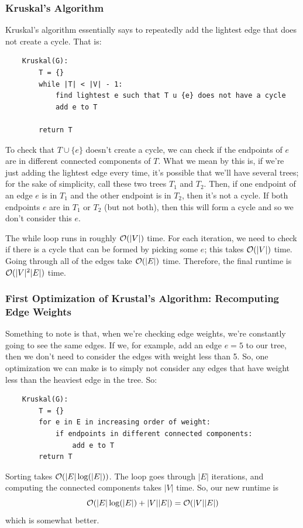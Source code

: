 \documentclass[letterpaper]{article}
\begin{document}
\subsubsection{Kruskal's Algorithm}
Kruskal's algorithm essentially says to repeatedly add the lightest edge that does not create a cycle. That is: 

\begin{verbatim}
    Kruskal(G):
        T = {}
        while |T| < |V| - 1:
            find lightest e such that T u {e} does not have a cycle 
            add e to T 

        return T 
\end{verbatim}
To check that $T \cup \{e\}$ doesn't create a cycle, we can check if the endpoints of $e$ are in different connected components of $T$. What we mean by this is, if we're just adding the lightest edge every time, it's possible that we'll have several trees; for the sake of simplicity, call these two trees $T_1$ and $T_2$. Then, if one endpoint of an edge $e$ is in $T_1$ and the other endpoint is in $T_2$, then it's not a cycle. If both endpoints $e$ are in $T_1$ or $T_2$ (but not both), then this will form a cycle and so we don't consider this $e$.

\bigskip 

The while loop runs in roughly $\mathcal{O}(|V|)$ time. For each iteration, we need to check if there is a cycle that can be formed by picking some $e$; this takes $\mathcal{O}(|V|)$ time. Going through all of the edges take $\mathcal{O}(|E|)$ time. Therefore, the final runtime is $\mathcal{O}(|V|^2 |E|)$ time. 

\subsubsection{First Optimization of Krustal's Algorithm: Recomputing Edge Weights}
Something to note is that, when we're checking edge weights, we're constantly going to see the same edges. If we, for example, add an edge $e = 5$ to our tree, then we don't need to consider the edges with weight less than 5. So, one optimization we can make is to simply not consider any edges that have weight less than the heaviest edge in the tree. So: 
\begin{verbatim}
    Kruskal(G):
        T = {}
        for e in E in increasing order of weight:
            if endpoints in different connected components:
                add e to T 
        return T 
\end{verbatim}
Sorting takes $\mathcal{O}(|E|\log(|E|))$. The loop goes through $|E|$ iterations, and computing the connected components takes $|V|$ time. So, our new runtime is 
\[\mathcal{O}(|E|\log(|E|) + |V||E|) = \mathcal{O}(|V||E|)\]
which is somewhat better. 
\end{document}
